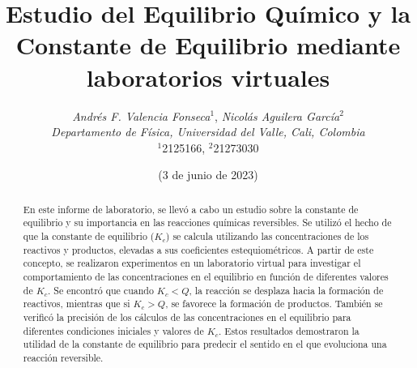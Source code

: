 \documentclass[10pt]{article}
\title{
    Estudio del Equilibrio Químico y la Constante de Equilibrio mediante laboratorios virtuales
}
\author{
    \normalsize{
        \emph{Andrés F. Valencia Fonseca}$^{1}$,
        \emph{Nicolás Aguilera García}$^{2}$
    } \\
    \normalsize{
        \emph{Departamento de Física, Universidad del Valle, Cali, Colombia}
    } \\
    \small{$^{1}$2125166, $^{2}$21273030}
}
\date{(\small 3 de junio de 2023)}
\begin{document}
\maketitle
\begin{abstract}
    En este informe de laboratorio, se llevó a cabo un estudio sobre la constante de equilibrio y su importancia en las reacciones químicas reversibles. Se utilizó el hecho de que la constante de equilibrio ($K_c$) se calcula utilizando las concentraciones de los reactivos y productos, elevadas a sus coeficientes estequiométricos. A partir de este concepto, se realizaron experimentos en un laboratorio virtual para investigar el comportamiento de las concentraciones en el equilibrio en función de diferentes valores de $K_c$. Se encontró que cuando $K_c < Q$, la reacción se desplaza hacia la formación de reactivos, mientras que si $K_c > Q$, se favorece la formación de productos. También se verificó la precisión de los cálculos de las concentraciones en el equilibrio para diferentes condiciones iniciales y valores de $K_c$. Estos resultados demostraron la utilidad de la constante de equilibrio para predecir el sentido en el que evoluciona una reacción reversible.
\end{abstract}
\end{document}
